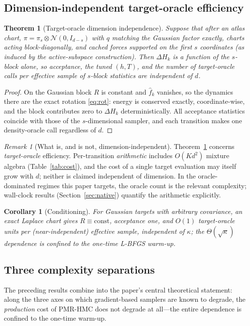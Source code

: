 \documentclass[11pt]{article}
\newtheorem{theorem}{Theorem}
\newtheorem{corollary}{Corollary}
\theoremstyle{remark}
\newtheorem{remark}{Remark}
\begin{document}
\subsection{Dimension-independent target-oracle efficiency}
\begin{theorem}[Target-oracle dimension independence]\label{thm:dimfree}
Suppose that after an atlas chart, $\pi=\pi_s\otimes\mathcal N(0,I_{d-s})$
with $q$ matching the Gaussian factor exactly, charts acting
block-diagonally, and cached forces supported on the first $s$
coordinates (as induced by the active-subspace construction). Then
$\Delta H_k$ is a function of the $s$-block alone, so acceptance, the
tuned $(h,T)$, and the number of \emph{target-oracle} calls per effective
sample of $s$-block statistics are independent of $d$.
\end{theorem}
\begin{proof}
On the Gaussian block $R$ is constant and $\hat f_k$ vanishes, so the
dynamics there are the exact rotation \eqref{eq:rot}: energy is conserved
exactly, coordinate-wise, and the block contributes zero to $\Delta H_k$
deterministically. All acceptance statistics coincide with those of the
$s$-dimensional sampler, and each transition makes one density-oracle
call regardless of $d$.
\end{proof}

\begin{remark}[What is, and is not, dimension-independent]
Theorem~\ref{thm:dimfree} concerns \emph{target-oracle} efficiency.
Per-transition \emph{arithmetic} includes $O(Kd^2)$ mixture algebra
(Table~\ref{tab:cost}), and the cost of a single target evaluation may
itself grow with $d$; neither is claimed independent of dimension. In
the oracle-dominated regimes this paper targets, the oracle count is the
relevant complexity; wall-clock results (Section~\ref{sec:native})
quantify the arithmetic explicitly.
\end{remark}

\begin{corollary}[Conditioning]\label{cor:kappa}
For Gaussian targets with arbitrary covariance, an exact Laplace chart
gives $R\equiv\mathrm{const}$, acceptance one, and $O(1)$ target-oracle
units per (near-independent) effective sample, independent of $\kappa$;
the $\Theta(\sqrt\kappa)$ dependence is confined to the one-time L-BFGS
warm-up.
\end{corollary}

\subsection{Three complexity separations}\label{sec:separations}
The preceding results combine into the paper's central theoretical
statement: along the three axes on which gradient-based samplers are
known to degrade, the \emph{production} cost of PMR-HMC does not degrade
at all---the entire dependence is confined to the one-time warm-up.
\end{document}
